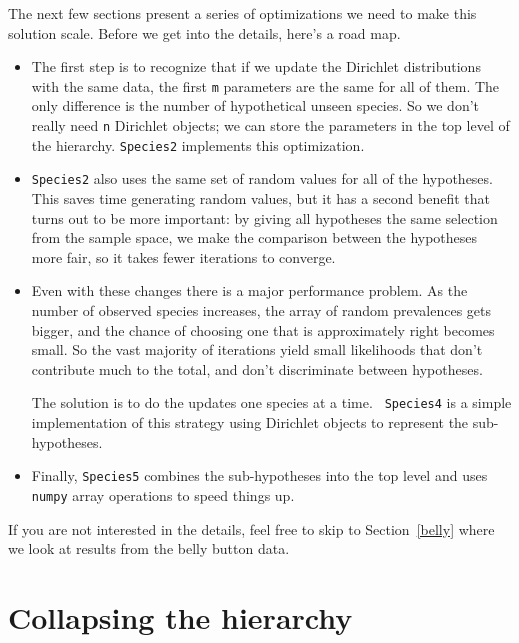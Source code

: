 \documentclass[12pt]{book}
\begin{document}
The next few sections present a series of optimizations we need to
make this solution scale.  Before we get into the details, here's
a road map.

\begin{itemize}

\item The first step is to recognize that if we update the Dirichlet
  distributions with the same data, the first {\tt m} parameters are
  the same for all of them.  The only difference is the number of
  hypothetical unseen species.  So we don't really need {\tt n}
  Dirichlet objects; we can store the parameters in the top level of
  the hierarchy.  {\tt Species2} implements this optimization.

\item {\tt Species2} also uses the same set of random values for all
  of the hypotheses.  This saves time generating random values, but it
  has a second benefit that turns out to be more important: by giving
  all hypotheses the same selection from the sample space, we make
  the comparison between the hypotheses more fair, so it takes
  fewer iterations to converge.

\item Even with these changes there is a major performance problem.
  As the number of observed species increases, the array of random
  prevalences gets bigger, and the chance of choosing one that is
  approximately right becomes small.  So the vast majority of
  iterations yield small likelihoods that don't contribute much to the
  total, and don't discriminate between hypotheses.

  The solution is to do the updates one species at a time.  {\tt
  Species4} is a simple implementation of this strategy using
  Dirichlet objects to represent the sub-hypotheses.

\item Finally, {\tt Species5} combines the sub-hypotheses into the top
  level and uses {\tt numpy} array operations to speed things up.

\end{itemize}

If you are not interested in the details, feel free to skip to
Section~\ref{belly} where we look at results from the belly
button data.


\section{Collapsing the hierarchy}
\label{collapsing}
\end{document}
